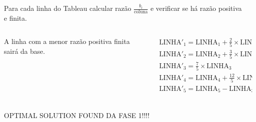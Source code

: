 \documentclass{beamer}
\begin{document}
\begin{frame}
{\begin{columns}
\begin{column}{5cm}
			\end{column}
		\end{columns}
	}	
	{
		\begin{columns}
			\begin{column}{5cm}
				\begin{mdframed}[backgroundcolor=olive!80]
					Para cada linha do Tableau calcular razão $\frac{b_i}{\text{coluna}}$ e verificar se há razão positiva e finita.
				\end{mdframed}
			\end{column}
			\begin{column}{5cm}

			\end{column}
		\end{columns}
	}	
	\only<12>
	{
		\begin{columns}
			\begin{column}{5cm}
				\begin{mdframed}[backgroundcolor=orange!80]
					A linha com a menor razão positiva finita sairá da base.
				\end{mdframed}
			\end{column}
			\begin{column}{5cm}
				$
					\begin{matrix}
						\scriptstyle \text{LINHA}'_1 = \text{LINHA}_1 + \frac{2}{5} \times \text{LINHA}_3\\
						\scriptstyle \text{LINHA}'_2 = \text{LINHA}_2 + \frac{3}{5} \times \text{LINHA}_3\\
						\scriptstyle \text{LINHA}'_3 = \frac{7}{5} \times \text{LINHA}_3  \\
						\scriptstyle \text{LINHA}'_4 = \text{LINHA}_4 + \frac{12}{5} \times \text{LINHA}_3 \\
						\scriptstyle \text{LINHA}'_5 = \text{LINHA}_5 - \text{LINHA}_3 \\
					\end{matrix}
				$
			\end{column}
		\end{columns}
	}	
	\only<13>
	{
		\begin{columns}
			\begin{column}{5cm}
				\begin{mdframed}[backgroundcolor=red!80]
					\centering
					OPTIMAL SOLUTION FOUND DA FASE 1!!!!
				\end{mdframed}
			\end{column}
			\begin{column}{5cm}


\end{column}
\end{columns}}
\end{frame}
\end{document}
